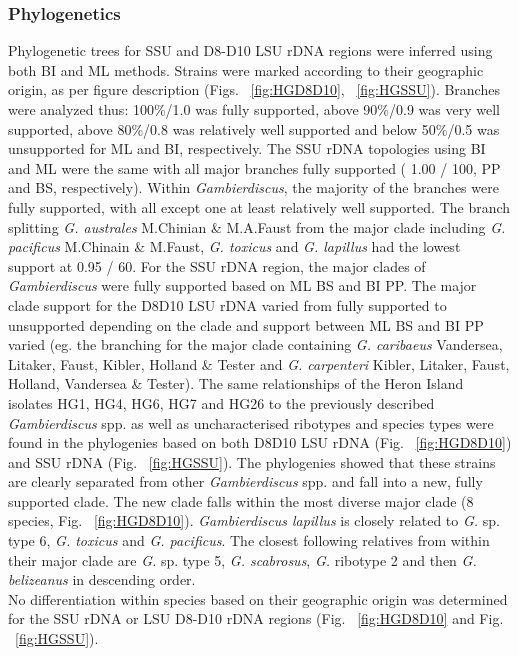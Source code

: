 \documentclass[12pt]{article}
\begin{document}
\FloatBarrier
\subsubsection{Phylogenetics}
\FloatBarrier 
Phylogenetic trees for SSU and D8-D10 LSU rDNA regions were inferred using both BI and ML methods. 
Strains were marked according to their geographic origin, as per figure description (Figs. ~\ref{fig:HGD8D10}, ~\ref{fig:HGSSU}). 
Branches were analyzed thus: 100\%/1.0 was fully supported, above 90\%/0.9 was very well supported, above 80\%/0.8 was relatively well supported and below 50\%/0.5 was unsupported for ML and BI, respectively.
The SSU rDNA  topologies using BI and ML were the same with all major branches fully supported ( 1.00 / 100, PP and BS, respectively). 
Within \emph{Gambierdiscus}, the majority of the branches were fully supported, with all except one at least relatively well supported. 
The branch splitting \emph{G. australes} M.Chinian \& M.A.Faust from the major clade including \emph{G. pacificus} M.Chinain \&
M.Faust, \emph{G. toxicus} and \emph{G. lapillus} had the lowest support at 0.95 / 60.
For the SSU rDNA region, the major clades of \textit{Gambierdiscus} were fully supported based on ML BS and BI PP. 
The major clade support for the D8D10 LSU rDNA varied from fully supported to unsupported depending on the clade and support between ML BS and BI PP varied (eg. the branching for the major clade containing \emph{G. caribaeus} Vandersea, Litaker, Faust, Kibler, Holland \& Tester and \emph{G. carpenteri} Kibler, Litaker, Faust, Holland, Vandersea \& Tester). 
The same relationships of the Heron Island isolates HG1, HG4, HG6, HG7 and HG26 to the previously described \emph{Gambierdiscus} spp. as well as uncharacterised ribotypes and species types were found in the phylogenies based on both D8D10 LSU rDNA (Fig. ~\ref{fig:HGD8D10}) and SSU rDNA (Fig. ~\ref{fig:HGSSU}). 
The phylogenies showed that these strains are clearly separated from other \emph{Gambierdiscus} spp. and fall into a new, fully supported clade. 
The new clade falls within the most diverse major clade (8 species, Fig. ~\ref{fig:HGD8D10}). 
\emph{Gambierdiscus lapillus} is closely related to \emph{G.} sp. type 6, \emph{G. toxicus} and \emph{G. pacificus}. 
The closest following relatives from within their major clade are \emph{G.} sp. type 5, \emph{G. scabrosus}, \emph{G.} ribotype 2 and then \emph{G. belizeanus} in descending order. \\
No differentiation within species based on their geographic origin was determined for the SSU rDNA or LSU D8-D10 rDNA regions (Fig. ~\ref{fig:HGD8D10} and Fig. ~\ref{fig:HGSSU}).
\end{document}
